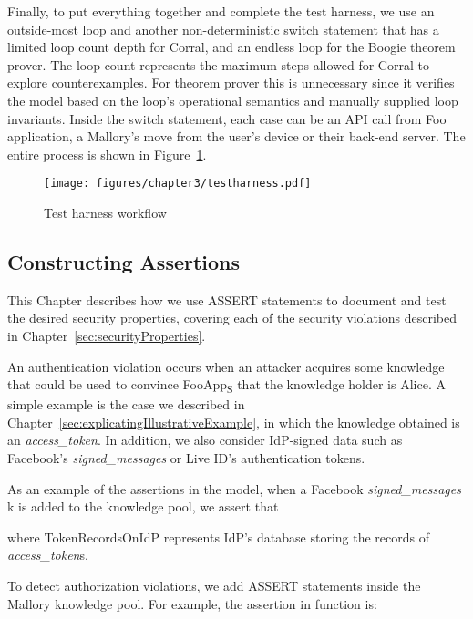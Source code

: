   Finally, to put everything together and complete the test harness, we use an outside-most loop and another non-deterministic switch statement that has a limited loop count depth for Corral, and an endless loop for the Boogie theorem prover.  The loop count represents the maximum steps allowed for Corral to explore counterexamples.  For theorem prover this is unnecessary since it verifies the model based on the loop's operational semantics and manually supplied loop invariants.  Inside the switch statement, each case can be an API call from Foo application, a Mallory's move from the user's device or their back-end server.  The entire process is shown in Figure~\ref{fig:testharness}.

\begin{figure}[hbt]
\centering
\texttt{[image: figures/chapter3/testharness.pdf]}
\caption{Test harness workflow}
\label{fig:testharness}
\end{figure}

\subsection{Constructing Assertions}
\label{sec:explicatingConstructingAssertions}
This Chapter describes how we use ASSERT statements to document and test the desired security properties, covering each of the security violations described in Chapter~\ref{sec:securityProperties}. 

 An authentication violation occurs when an attacker acquires some knowledge that could be used to convince FooApp\textsubscript{S} that the knowledge holder is Alice.  A simple example is the case we described in Chapter~\ref{sec:explicatingIllustrativeExample}, in which the knowledge obtained is an \emph{access\_token}.  In addition, we also consider IdP-signed data such as Facebook's \emph{signed\_messages} or Live ID's authentication tokens.  

As an example of the assertions in the model, when a Facebook \emph{signed\_messages} k is added to the knowledge pool, we assert that


where TokenRecordsOnIdP represents IdP's database storing the records of \emph{access\_token}s.

 To detect authorization violations, we add ASSERT statements inside the Mallory knowledge pool.  For example, the assertion in function  is:

